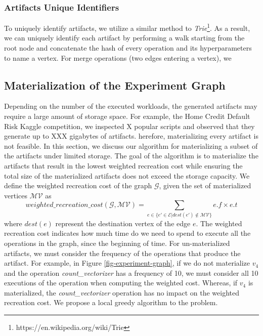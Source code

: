 \subsubsection{Artifacts Unique Identifiers}
To uniquely identify artifacts, we utilize a similar method to \textit{Trie}\footnote{https://en.wikipedia.org/wiki/Trie}.
As a result, we can uniquely identify each artifact by performing a walk starting from the root node and concatenate the hash of every operation and its hyperparameters to name a vertex.
For merge operations (two edges entering a vertex), we  

\subsection{Materialization of the Experiment Graph}\label{subsec-materialization}
Depending on the number of the executed workloads, the generated artifacts may require a large amount of storage space.
For example, the Home Credit Default Risk Kaggle competition, we inspected X popular scripts and observed that they generate up to XXX gigabytes of artifacts. 
herefore, materializing every artifact is not feasible.
In this section, we discuss our algorithm for materializing a subset of the artifacts under limited storage.
The goal of the algorithm is to materialize the artifacts that result in the lowest weighted recreation cost while ensuring the total size of the materialized artifacts does not exceed the storage capacity.
We define the weighted recreation cost of the graph $\mathcal{G}$, given the set of materialized vertices $\mathcal{MV}$ as 
\[
weighted\_recreation\_cost(\mathcal{G}, \mathcal{MV}) =  \sum\limits_{e \in \{e' \in \mathcal{E}  \lvert dest(e') \notin \mathcal{MV}\}}  e.f \times e.t
\]
where $dest(e)$ represent the destination vertex of the edge $e$.
The weighted recreation cost indicates how much time do we need to spend to execute all the operations in the graph, since the beginning of time.
For un-materialized artifacts, we must consider the frequency of the operations that produce the artifact.
For example, in Figure \ref{fig-experiment-graph}, if we do not materialize $v_4$ and the operation \textit{count\_vectorizer} has a frequency of 10, we must consider all 10 executions of the operation when computing the weighted cost.
Whereas, if $v_4$ is materialized, the \textit{count\_vectorizer} operation has no impact on the weighted recreation cost.
We propose a local greedy algorithm to the problem.

